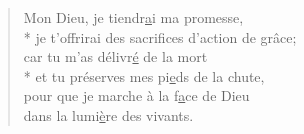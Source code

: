 \begin{verse}
Mon Dieu, je tiendr\underline{a}i ma promesse, \\*
je t’offrirai des sacrif\underline{i}ces d’action de grâce; \\
car tu m’as délivr\underline{é} de la mort \\*
et tu préserves mes pi\underline{e}ds de la chute, \\
pour que je marche à la f\underline{a}ce de Dieu \\
dans la lumi\underline{è}re des vivants. \\
\end{verse}

